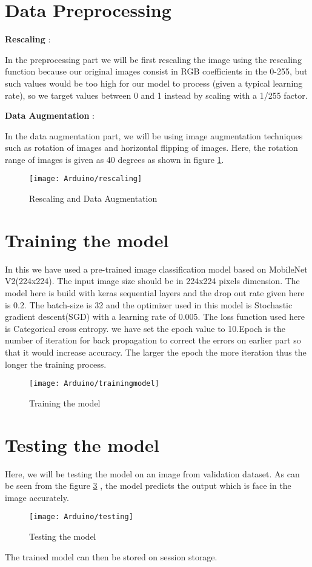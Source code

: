 	\section{Data Preprocessing}
	\textbf{Rescaling} :
	
	In the preprocessing part we will be first rescaling the image using the rescaling function  because our original images consist in RGB coefficients in the 0-255, but such values would be too high for our model to process (given a typical learning rate), so we target values between 0 and 1 instead by scaling with a 1/255 factor. 
	
	\textbf{Data Augmentation} :
	
	In the data augmentation part, we will be using image augmentation techniques such as  rotation of images and horizontal flipping of images.  Here, the rotation range of images is given as 40 degrees as shown in figure \ref{figure 10.3}.
	\begin{figure}[H]
		\centering
		\texttt{[image: Arduino/rescaling]}
		\caption{Rescaling and Data Augmentation}
		\label{figure 10.3}
	\end{figure}
	
	\section{Training the model}
	In this we have used a pre-trained image classification model based on MobileNet V2(224x224). The input image size should be in 224x224 pixels dimension. The model here is build with keras sequential layers and the drop out rate given here is 0.2. The batch-size is 32 and the optimizer used in this model is Stochastic gradient descent(SGD) with a learning rate of 0.005. The loss function used here is Categorical cross entropy. we have set the epoch value to 10.Epoch is the number of iteration for back propagation to correct the errors on earlier part so that it would increase accuracy. The larger the epoch the more iteration thus the longer the training process.
	
	\begin{figure}[H]
		\centering
		\texttt{[image: Arduino/trainingmodel]}
		\caption{Training the model}
		\label{figure 10.4}
	\end{figure}
	
	\section{Testing the model}
	Here, we will be testing the model on an image from validation dataset. As can be seen from the figure  \ref{figure 10.5} , the model predicts the output which is face in the image accurately.
	\begin{figure}[H]
		\centering
		\texttt{[image: Arduino/testing]}
		\caption{Testing the model}
		\label{figure 10.5}
	\end{figure}
	The trained model can then be stored on session storage.
	
